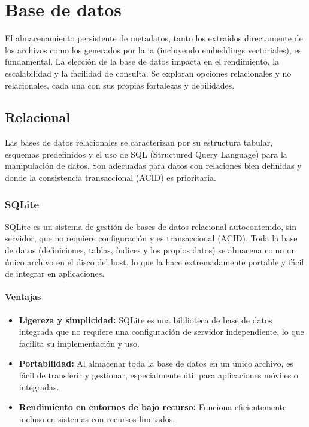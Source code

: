 \clearpage
\section{Base de datos}
El almacenamiento persistente de metadatos, tanto los extraídos directamente de los archivos como los generados por la \gls{ia} (incluyendo embeddings vectoriales), es fundamental. La elección de la base de datos impacta en el rendimiento, la escalabilidad y la facilidad de consulta. Se exploran opciones relacionales y no relacionales, cada una con sus propias fortalezas y debilidades.

\subsection{Relacional}
Las bases de datos relacionales se caracterizan por su estructura tabular, esquemas predefinidos y el uso de SQL (Structured Query Language) para la manipulación de datos. Son adecuadas para datos con relaciones bien definidas y donde la consistencia transaccional (ACID) es prioritaria.

\subsubsection{SQLite}
SQLite es un sistema de gestión de bases de datos relacional autocontenido, sin servidor, que no requiere configuración y es transaccional (ACID). Toda la base de datos (definiciones, tablas, índices y los propios datos) se almacena como un único archivo en el disco del host, lo que la hace extremadamente portable y fácil de integrar en aplicaciones.

\paragraph{Ventajas}
\begin{itemize}
    \item \textbf{Ligereza y simplicidad:} SQLite es una biblioteca de base de datos integrada que no requiere una configuración de servidor independiente, lo que facilita su implementación y uso.
    \item \textbf{Portabilidad:} Al almacenar toda la base de datos en un único archivo, es fácil de transferir y gestionar, especialmente útil para aplicaciones móviles o integradas.
    \item \textbf{Rendimiento en entornos de bajo recurso:} Funciona eficientemente incluso en sistemas con recursos limitados.
\end{itemize}

